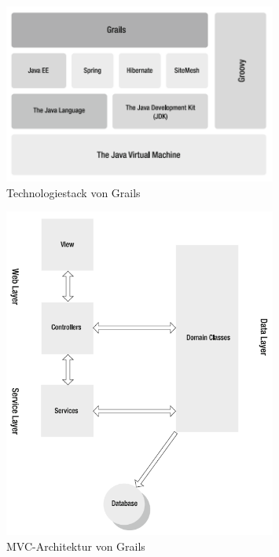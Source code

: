 \begin{figure}[H]
\centering
\includegraphics[width=0.80\textwidth]{img/Grails-Stack.png}
\caption {Technologiestack von Grails}
\end{figure}
\begin{figure}[H]
\centering
\includegraphics[width=0.80\textwidth]{img/MVC-Grails.png}
\caption {MVC-Architektur von Grails}
\end{figure}
\subsubsection{}